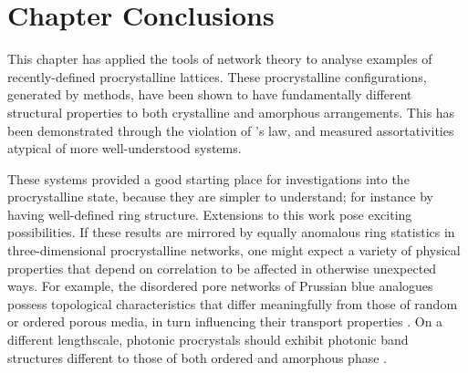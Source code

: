 \section{Chapter Conclusions}

This chapter has applied the tools of network theory to analyse \td{} examples of recently\--defined procrystalline lattices.
These procrystalline configurations, generated by \mc{} methods, have been shown to have fundamentally different structural properties to both crystalline and amorphous arrangements.
This has been demonstrated through the violation of \lm's law, and measured assortativities atypical of more well\--understood systems.

These \td{} systems provided a good starting place for investigations into the procrystalline state, because they are simpler to understand; for instance by having well\--defined ring structure.
Extensions to this work pose exciting possibilities.
If these results are mirrored by equally anomalous ring statistics in three\--dimensional procrystalline networks, one might expect a variety of physical properties that depend on correlation to be affected in otherwise unexpected ways. 
For example, the disordered pore networks of Prussian blue analogues possess topological characteristics that differ meaningfully from those of random or ordered porous media, in turn influencing their transport properties \cite{Simonov2020}.
On a different lengthscale, photonic procrystals should exhibit photonic band structures different to those of both ordered and amorphous phase \cite{Florescu2009,Sellers2017}.
